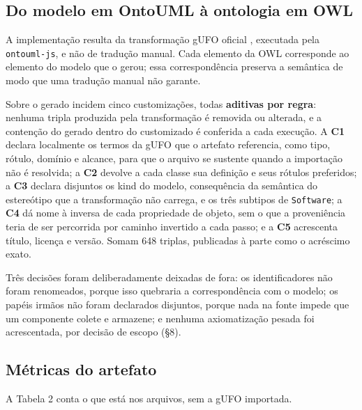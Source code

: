 \subsection{Do modelo em OntoUML à ontologia em OWL}

A implementação resulta da transformação gUFO oficial \cite{almeida2019gufo}, executada pela \texttt{ontouml-js}, e não de tradução manual. Cada elemento da OWL corresponde ao elemento do modelo que o gerou; essa correspondência preserva a semântica de modo que uma tradução manual não garante.

Sobre o gerado incidem cinco customizações, todas \textbf{aditivas por regra}: nenhuma tripla produzida pela transformação é removida ou alterada, e a contenção do gerado dentro do customizado é conferida a cada execução. A \textbf{C1} declara localmente os termos da gUFO que o artefato referencia, como tipo, rótulo, domínio e alcance, para que o arquivo se sustente quando a importação não é resolvida; a \textbf{C2} devolve a cada classe sua definição e seus rótulos preferidos; a \textbf{C3} declara disjuntos os \guillemotleft{}kind\guillemotright{} do modelo, consequência da semântica do estereótipo que a transformação não carrega, e os três subtipos de \texttt{Software}; a \textbf{C4} dá nome à inversa de cada propriedade de objeto, sem o que a proveniência teria de ser percorrida por caminho invertido a cada passo; e a \textbf{C5} acrescenta título, licença e versão. Somam 648 triplas, publicadas à parte como o acréscimo exato.

Três decisões foram deliberadamente deixadas de fora: os identificadores não foram renomeados, porque isso quebraria a correspondência com o modelo; os papéis irmãos não foram declarados disjuntos, porque nada na fonte impede que um componente colete e armazene; e nenhuma axiomatização pesada foi acrescentada, por decisão de escopo (\S{}8).

\subsection{Métricas do artefato}

A Tabela 2 conta o que está nos arquivos, sem a gUFO importada.

